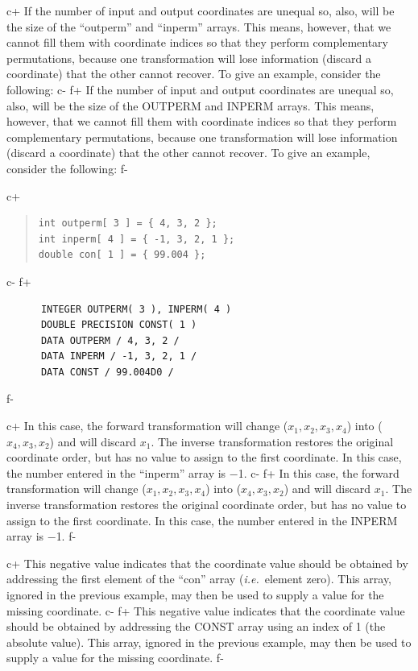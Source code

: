 \documentclass[twoside,11pt]{article}
\begin{document}
c+
If the number of input and output coordinates are unequal so, also,
will be the size of the ``outperm'' and ``inperm'' arrays. This means,
however, that we cannot fill them with coordinate indices so that they
perform complementary permutations, because one transformation will
lose information (discard a coordinate) that the other cannot recover.
To give an example, consider the following:
c-
f+
If the number of input and output coordinates are unequal so, also,
will be the size of the OUTPERM and INPERM arrays. This means,
however, that we cannot fill them with coordinate indices so that they
perform complementary permutations, because one transformation will
lose information (discard a coordinate) that the other cannot recover.
To give an example, consider the following:
f-

c+
\begin{quote}
\small
\begin{verbatim}
int outperm[ 3 ] = { 4, 3, 2 };
int inperm[ 4 ] = { -1, 3, 2, 1 };
double con[ 1 ] = { 99.004 };
\end{verbatim}
\normalsize
\end{quote}
c-
f+
\small
\begin{verbatim}
      INTEGER OUTPERM( 3 ), INPERM( 4 )
      DOUBLE PRECISION CONST( 1 )
      DATA OUTPERM / 4, 3, 2 /
      DATA INPERM / -1, 3, 2, 1 /
      DATA CONST / 99.004D0 /
\end{verbatim}
\normalsize
f-

c+
In this case, the forward transformation will change
($x_1,x_2,x_3,x_4$) into ($x_4,x_3,x_2$) and will discard $x_1$. The
inverse transformation restores the original coordinate order, but has
no value to assign to the first coordinate. In this case, the number
entered in the ``inperm'' array is $-$1.
c-
f+
In this case, the forward transformation will change
($x_1,x_2,x_3,x_4$) into ($x_4,x_3,x_2$) and will discard $x_1$. The
inverse transformation restores the original coordinate order, but has
no value to assign to the first coordinate. In this case, the number
entered in the INPERM array is $-$1.
f-

c+
This negative value indicates that the coordinate value should be
obtained by addressing the first element of the ``con'' array
({\em{i.e.}}\ element zero). This array, ignored in the previous
example, may then be used to supply a value for the missing
coordinate.
c-
f+
This negative value indicates that the coordinate value should be
obtained by addressing the CONST array using an index of 1 (the
absolute value). This array, ignored in the previous example, may then
be used to supply a value for the missing coordinate.
f-
\end{document}
